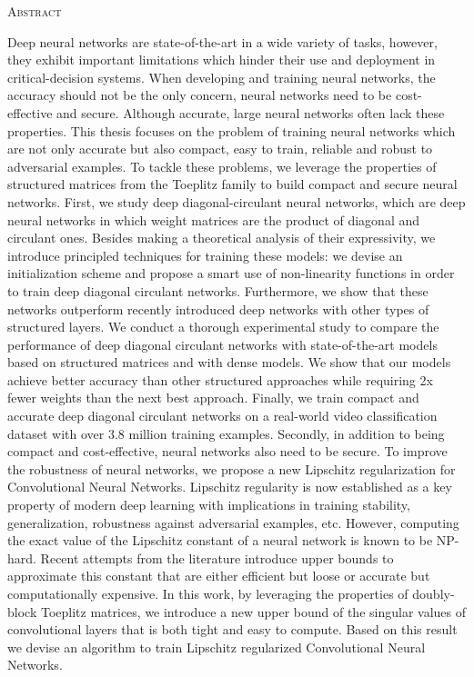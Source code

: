 \newpage
\begin{center}
  {\Huge \textsc{Abstract}}
\end{center}
%
\noindent
%

Deep neural networks are state-of-the-art in a wide variety of tasks, however, they exhibit important limitations which hinder their use and deployment in critical-decision systems.
When developing and training neural networks, the accuracy should not be the only concern, neural networks need to be cost-effective and secure. 
Although accurate, large neural networks often lack these properties.
This thesis focuses on the problem of training neural networks which are not only accurate but also compact, easy to train, reliable and robust to adversarial examples.
To tackle these problems, we leverage the properties of structured matrices from the Toeplitz family to build compact and secure neural networks. 
First, we study deep diagonal-circulant neural networks, which are deep neural networks in which weight matrices are the product of diagonal and circulant ones.
Besides making a theoretical analysis of their expressivity, we introduce principled techniques for training these models: we devise an initialization scheme and propose a smart use of non-linearity functions in order to train deep diagonal circulant networks.
Furthermore, we show that these networks outperform recently introduced deep networks with other types of structured layers.
We conduct a thorough experimental study to compare the performance of deep diagonal circulant networks with state-of-the-art models based on structured matrices and with dense models.
We show that our models achieve better accuracy than other structured approaches while requiring 2x fewer weights than the next best approach.
Finally, we train compact and accurate deep diagonal circulant networks on a real-world video classification dataset with over 3.8 million training examples.
Secondly, in addition to being compact and cost-effective, neural networks also need to be secure.
To improve the robustness of neural networks, we propose a new Lipschitz regularization for Convolutional Neural Networks.
Lipschitz regularity is now established as a key property of modern deep learning with implications in training stability, generalization, robustness against adversarial examples, etc.
However, computing the exact value of the Lipschitz constant of a neural network is known to be NP-hard.
Recent attempts from the literature introduce upper bounds to approximate this constant that are either efficient but loose or accurate but computationally expensive.
In this work, by leveraging the properties of doubly-block Toeplitz matrices, we introduce a new upper bound of the singular values of convolutional layers that is both tight and easy to compute.
Based on this result we devise an algorithm to train Lipschitz regularized Convolutional Neural Networks.




\newpage
\null
\thispagestyle{empty}
\newpage
